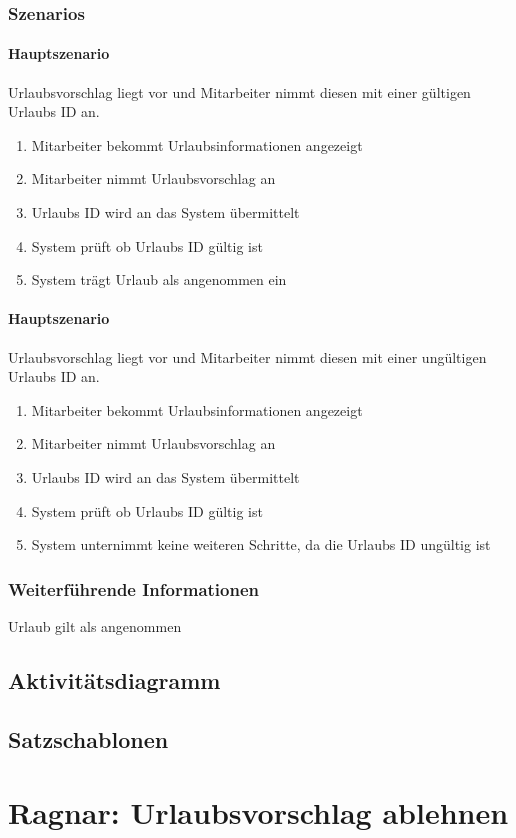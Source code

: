 \subsubsection{Szenarios}
\paragraph{Hauptszenario}
Urlaubsvorschlag liegt vor und Mitarbeiter nimmt diesen mit einer gültigen Urlaubs ID an.

\begin{enumerate}
	\item Mitarbeiter bekommt Urlaubsinformationen angezeigt
	\item Mitarbeiter nimmt Urlaubsvorschlag an
	\item Urlaubs ID wird an das System übermittelt
	\item System prüft ob Urlaubs ID gültig ist
	\item System trägt Urlaub als angenommen ein
\end{enumerate}



\paragraph{Hauptszenario}
Urlaubsvorschlag liegt vor und Mitarbeiter nimmt diesen mit einer ungültigen Urlaubs ID an.

\begin{enumerate}
	\item Mitarbeiter bekommt Urlaubsinformationen angezeigt
	\item Mitarbeiter nimmt Urlaubsvorschlag an
	\item Urlaubs ID wird an das System übermittelt
	\item System prüft ob Urlaubs ID gültig ist
	\item System unternimmt keine weiteren Schritte, da die Urlaubs ID ungültig ist
\end{enumerate}


\subsubsection{Weiterführende Informationen}
Urlaub gilt als angenommen

\subsection{Aktivitätsdiagramm}

\begin{center}
\end{center}

\subsection{Satzschablonen}


\section{Ragnar: Urlaubsvorschlag ablehnen}

 

